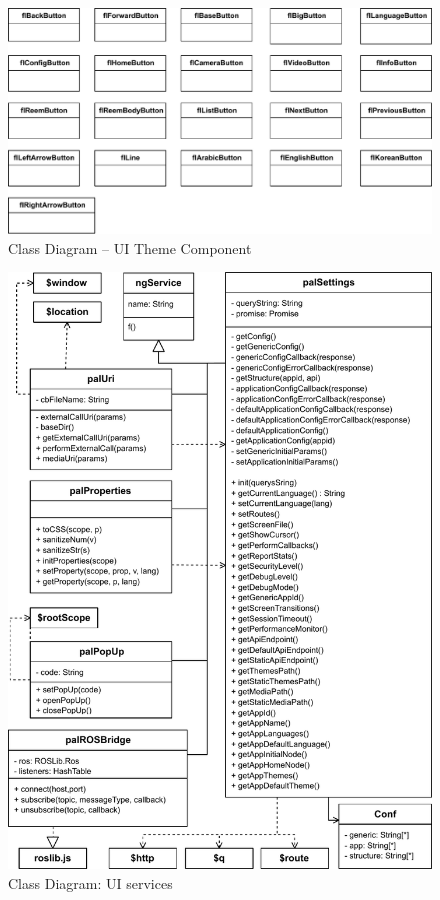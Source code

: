 \begin{figure}
    \centering
    \includegraphics{figures/design-class-themecomponents.pdf}
    \caption{Class Diagram -- UI Theme Component}
    \label{fig:class-themecomponent}
\end{figure}

\begin{figure}[htb]
    \centering
    \includegraphics{figures/design-class-services.pdf}
    \caption{Class Diagram: UI services}
    \label{fig:class-services}
\end{figure}


